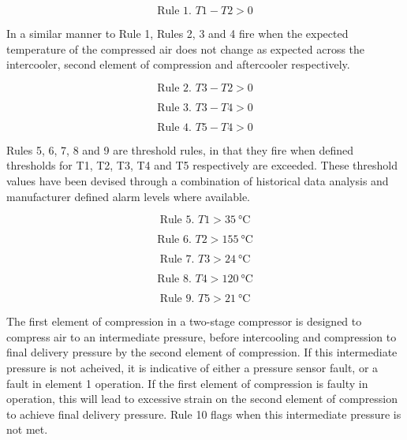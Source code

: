 \begin{equation}
\text{Rule 1. } T1 - T2 > 0
\label{eq:rule1}
\end{equation}

In a similar manner to Rule 1, Rules 2, 3 and 4 fire when the expected temperature of the compressed air does not change as expected across the intercooler, second element of compression and aftercooler respectively.

\begin{equation}
\text{Rule 2. } T3 - T2 >0
\label{eq:rule2}
\end{equation}

\begin{equation}
\text{Rule 3. } T3 - T4 >0
\label{eq:rule3}
\end{equation}

\begin{equation}
\text{Rule 4. } T5 - T4 > 0
\label{eq:rule4}
\end{equation}

Rules 5, 6, 7, 8 and 9 are threshold rules, in that they fire when defined thresholds for T1, T2, T3, T4 and T5 respectively are exceeded. These threshold values have been devised through a combination of historical data analysis and manufacturer defined alarm levels where available.

\begin{equation}
\text{Rule 5. } T1 > \SI{35}{\degreeCelsius}
\label{eq:rule5}
\end{equation}

\begin{equation}
\text{Rule 6. } T2 > \SI{155}{\degreeCelsius}
\label{eq:rule6}
\end{equation}

\begin{equation}
\text{Rule 7. } T3 > \SI{24}{\degreeCelsius}
\label{eq:rule7}
\end{equation}

\begin{equation}
\text{Rule 8. } T4 > \SI{120}{\degreeCelsius}
\label{eq:rule8}
\end{equation}

\begin{equation}
\text{Rule 9. } T5 > \SI{21}{\degreeCelsius}
\label{eq:rule9}
\end{equation}

The first element of compression in a two-stage compressor is designed to compress air to an intermediate pressure, before intercooling and compression to final delivery pressure by the second element of compression. If this intermediate pressure is not acheived, it is indicative of either a pressure sensor fault, or a fault in element 1 operation. If the first element of compression is faulty in operation, this will lead to excessive strain on the second element of compression to achieve final delivery pressure. Rule 10 flags when this intermediate pressure is not met.

